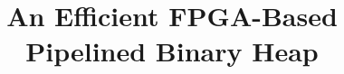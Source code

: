 \title{An Efficient FPGA-Based Pipelined Binary Heap}

\ifdefined\DRAFT
 \pagestyle{fancyplain}
 \rhead{\thedate}
\fi

\author{}
